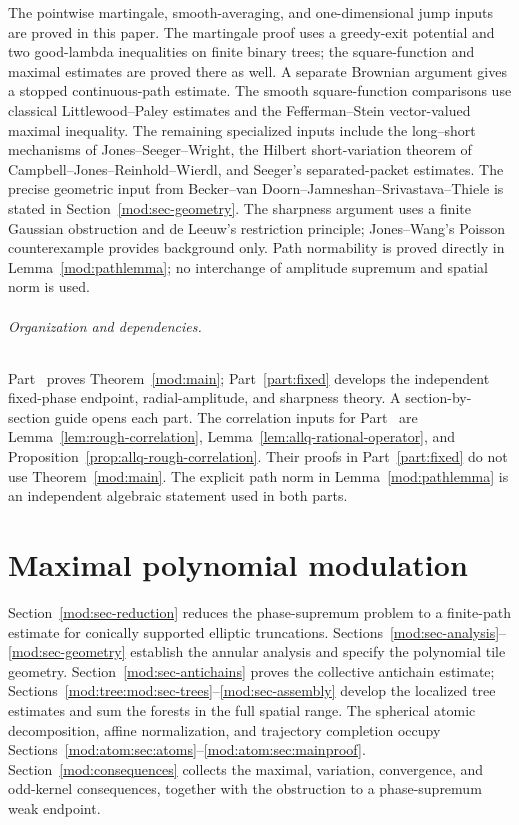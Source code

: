 \documentclass[11pt]{article}
\numberwithin{equation}{section}
\theoremstyle{remark}
\theoremstyle{definition}
\begin{document}
The pointwise martingale, smooth-averaging, and one-dimensional
jump inputs are proved in this paper. The martingale proof uses a
greedy-exit potential and two good-lambda inequalities on finite binary
trees; the square-function and maximal estimates are proved there as
well. A separate Brownian argument gives a stopped continuous-path
estimate. The smooth square-function comparisons use classical
Littlewood--Paley estimates and the
Fefferman--Stein vector-valued maximal inequality. The remaining
specialized inputs include the long--short mechanisms of
Jones--Seeger--Wright, the Hilbert short-variation theorem of
Campbell--Jones--Reinhold--Wierdl, and Seeger's separated-packet estimates.
The precise geometric input from Becker--van Doorn--Jamneshan--Srivastava--Thiele
is stated in Section~\ref{mod:sec-geometry}. The sharpness argument uses
a finite Gaussian obstruction and de Leeuw's restriction principle;
Jones--Wang's Poisson counterexample \cite{JonesWang2004} provides background only. Path normability is proved directly in
Lemma~\ref{mod:pathlemma}; no interchange of amplitude supremum and
spatial norm is used.

\paragraph{Organization and dependencies.}
Part~\ref{part:modulation} proves Theorem~\ref{mod:main};
Part~\ref{part:fixed} develops the independent fixed-phase endpoint,
radial-amplitude, and sharpness theory. A section-by-section guide
opens each part. The correlation inputs for Part~\ref{part:modulation}
are Lemma~\ref{lem:rough-correlation},
Lemma~\ref{lem:allq-rational-operator}, and
Proposition~\ref{prop:allq-rough-correlation}. Their proofs in
Part~\ref{part:fixed} do not use Theorem~\ref{mod:main}.
The explicit path norm in Lemma~\ref{mod:pathlemma} is an independent
algebraic statement used in both parts.



\part{Maximal polynomial modulation}\label{part:modulation}
\noindent
Section~\ref{mod:sec-reduction} reduces the phase-supremum problem to a
finite-path estimate for conically supported elliptic truncations.
Sections~\ref{mod:sec-analysis}--\ref{mod:sec-geometry} establish the
annular analysis and specify the polynomial tile geometry.
Section~\ref{mod:sec-antichains} proves the collective antichain estimate;
Sections~\ref{mod:tree:mod:sec-trees}--\ref{mod:sec-assembly} develop the
localized tree estimates and sum the forests in the full spatial range.
The spherical atomic decomposition, affine normalization, and trajectory
completion occupy
Sections~\ref{mod:atom:sec:atoms}--\ref{mod:atom:sec:mainproof}.
Section~\ref{mod:consequences} collects the maximal, variation, convergence,
and odd-kernel consequences, together with the obstruction to a
phase-supremum weak endpoint.
\end{document}
